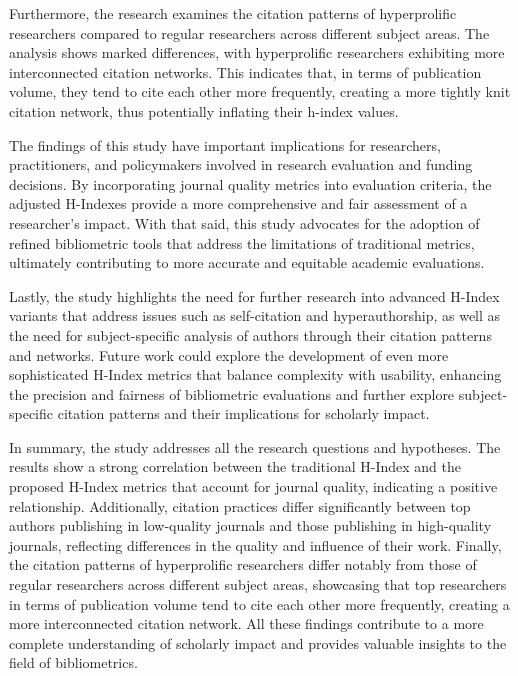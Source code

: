 Furthermore, the research examines the citation patterns of hyperprolific
researchers compared to regular researchers across different subject areas. The
analysis shows marked differences, with hyperprolific researchers exhibiting
more interconnected citation networks. This indicates that, in
terms of publication volume, they tend to cite each other more frequently, creating a
more tightly knit citation network, thus potentially inflating their h-index values.

The findings of this study have important implications for researchers,
practitioners, and policymakers involved in research evaluation and funding
decisions. By incorporating journal quality metrics into evaluation criteria,
the adjusted H-Indexes provide a more comprehensive and fair assessment of a
researcher’s impact. With that said, this study advocates for the adoption of refined
bibliometric tools that address the limitations of traditional metrics,
ultimately contributing to more accurate and equitable academic evaluations.

Lastly, the study highlights the need for further research into advanced
H-Index variants that address issues such as self-citation and hyperauthorship,
as well as the need for subject-specific analysis of authors through their
citation patterns and networks. Future work could explore the development of
even more sophisticated H-Index metrics that balance complexity with usability,
enhancing the precision and fairness of bibliometric evaluations and further 
explore subject-specific citation patterns and their implications for scholarly impact.

In summary, the study addresses all the research questions and hypotheses. The
results show a strong correlation between the traditional H-Index and the
proposed H-Index metrics that account for journal quality, indicating a
positive relationship. Additionally, citation practices differ significantly
between top authors publishing in low-quality journals and those publishing in
high-quality journals, reflecting differences in the quality and influence of
their work. Finally, the citation patterns of hyperprolific researchers differ
notably from those of regular researchers across different subject areas, showcasing
that top researchers in terms of publication volume tend to cite each other more
frequently, creating a more interconnected citation network. All these findings
contribute to a more complete understanding of scholarly impact and provides
valuable insights to the field of bibliometrics.

